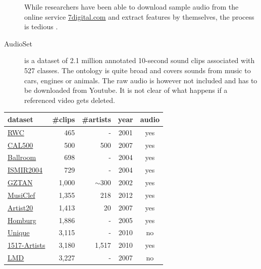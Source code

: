 \documentclass{article}
\begin{document}
\begin{description}
		While researchers have been able to download sample audio from the online service \href{https://www.7digital.com}{7digital.com} and extract features by themselves, the process is tedious \cite{msd_features}.
	\item[AudioSet] \cite{audioset} is a dataset of 2.1 million annotated 10-second sound clips associated with 527 classes. The ontology is quite broad and covers sounds from music to cars, engines or animals. The raw audio is however not included and has to be downloaded from Youtube. It is not clear of what happens if a referenced video gets deleted.
\end{description}

\begin{table}
	\centering
	\begin{threeparttable}
	\begin{tabular}{lrrcc}
		\toprule
		dataset & \#clips & \#artists & year & audio \\
		\midrule
		\href{https://staff.aist.go.jp/m.goto/RWC-MDB/}{RWC} \cite{RWC} & 465 & - & 2001 & yes \\
		\href{http://calab1.ucsd.edu/~datasets/cal500/}{CAL500} \cite{cal500} & 500 & 500 & 2007 & yes \\
		\href{http://mtg.upf.edu/ismir2004/contest/tempoContest/node5.html}{Ballroom} \cite{ballroom} & 698 & - & 2004 & yes \\
		\href{http://ismir2004.ismir.net/genre_contest/}{ISMIR2004} & 729 & - & 2004 & yes \\
		\href{https://marsyasweb.appspot.com/download/data_sets/}{GZTAN} \cite{gtzan} & 1,000 & $\sim300$ & 2002 & yes \\
		\href{http://www.cp.jku.at/datasets/musiclef/}{MusiClef} \cite{musiclef} & 1,355 & 218 & 2012 & yes \\
		\href{https://labrosa.ee.columbia.edu/projects/artistid/}{Artist20} \cite{artist20} & 1,413 & 20 & 2007 & yes \\
		\href{http://www-ai.cs.uni-dortmund.de/audio.html}{Homburg} \cite{garageband} & 1,886 & - & 2005 & yes \\  %
		\href{http://www.seyerlehner.info/index.php?p=1_3_Download}{Unique} & 3,115 & - & 2010 & no \\
		\href{http://www.seyerlehner.info/index.php?p=1_3_Download}{1517-Artists} & 3,180 & 1,517 & 2010 & yes \\
		\href{http://www.ppgia.pucpr.br/~silla/lmd/}{LMD} \cite{lmd} & 3,227 & - & 2007 & no \\

\end{tabular}
\end{threeparttable}
\end{table}
\end{document}
